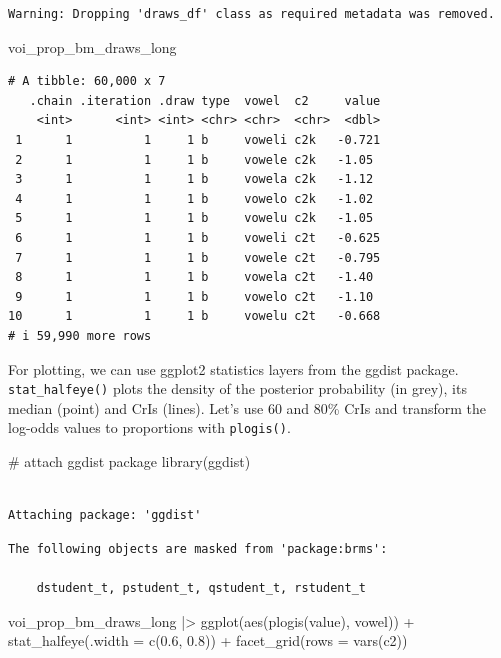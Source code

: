 \documentclass[
  authoryear,
  preprint,
  3p]{elsarticle}
\newenvironment{Shaded}{\begin{snugshade}}{\end{snugshade}}
\newcommand{\AttributeTok}[1]{\textcolor[rgb]{0.40,0.45,0.13}{#1}}
\newcommand{\CommentTok}[1]{\textcolor[rgb]{0.37,0.37,0.37}{#1}}
\newcommand{\FloatTok}[1]{\textcolor[rgb]{0.68,0.00,0.00}{#1}}
\newcommand{\FunctionTok}[1]{\textcolor[rgb]{0.28,0.35,0.67}{#1}}
\newcommand{\NormalTok}[1]{\textcolor[rgb]{0.00,0.23,0.31}{#1}}
\newcommand{\SpecialCharTok}[1]{\textcolor[rgb]{0.37,0.37,0.37}{#1}}
\begin{document}
\begin{verbatim}
Warning: Dropping 'draws_df' class as required metadata was removed.
\end{verbatim}

\begin{Shaded}
\begin{Highlighting}[]
\NormalTok{voi\_prop\_bm\_draws\_long}
\end{Highlighting}
\end{Shaded}

\begin{verbatim}
# A tibble: 60,000 x 7
   .chain .iteration .draw type  vowel  c2     value
    <int>      <int> <int> <chr> <chr>  <chr>  <dbl>
 1      1          1     1 b     voweli c2k   -0.721
 2      1          1     1 b     vowele c2k   -1.05 
 3      1          1     1 b     vowela c2k   -1.12 
 4      1          1     1 b     vowelo c2k   -1.02 
 5      1          1     1 b     vowelu c2k   -1.05 
 6      1          1     1 b     voweli c2t   -0.625
 7      1          1     1 b     vowele c2t   -0.795
 8      1          1     1 b     vowela c2t   -1.40 
 9      1          1     1 b     vowelo c2t   -1.10 
10      1          1     1 b     vowelu c2t   -0.668
# i 59,990 more rows
\end{verbatim}

For plotting, we can use ggplot2 statistics layers from the ggdist
package. \texttt{stat\_halfeye()} plots the density of the posterior
probability (in grey), its median (point) and CrIs (lines). Let's use 60
and 80\% CrIs and transform the log-odds values to proportions with
\texttt{plogis()}.

\begin{Shaded}
\begin{Highlighting}[]
\CommentTok{\# attach ggdist package}
\FunctionTok{library}\NormalTok{(ggdist)}
\end{Highlighting}
\end{Shaded}

\begin{verbatim}

Attaching package: 'ggdist'
\end{verbatim}

\begin{verbatim}
The following objects are masked from 'package:brms':

    dstudent_t, pstudent_t, qstudent_t, rstudent_t
\end{verbatim}

\begin{Shaded}
\begin{Highlighting}[]
\NormalTok{voi\_prop\_bm\_draws\_long }\SpecialCharTok{|\textgreater{}} 
  \FunctionTok{ggplot}\NormalTok{(}\FunctionTok{aes}\NormalTok{(}\FunctionTok{plogis}\NormalTok{(value), vowel)) }\SpecialCharTok{+}
  \FunctionTok{stat\_halfeye}\NormalTok{(}\AttributeTok{.width =} \FunctionTok{c}\NormalTok{(}\FloatTok{0.6}\NormalTok{, }\FloatTok{0.8}\NormalTok{)) }\SpecialCharTok{+}
  \FunctionTok{facet\_grid}\NormalTok{(}\AttributeTok{rows =} \FunctionTok{vars}\NormalTok{(c2))}
\end{Highlighting}
\end{Shaded}
\end{document}
